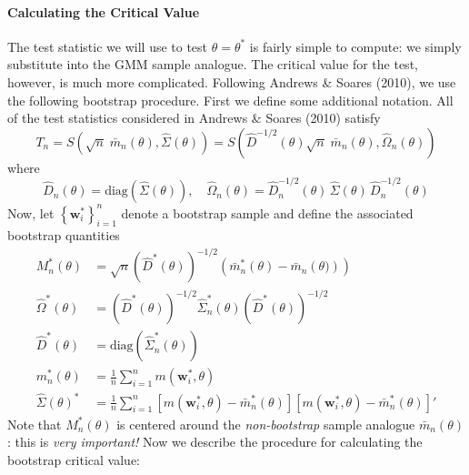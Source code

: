 \documentclass[12pt]{article}
\begin{document}
\paragraph{Calculating the Critical Value}
The test statistic we will use to test $\theta = \theta^*$ is fairly simple to compute: we simply substitute into the GMM sample analogue.
The critical value for the test, however, is much more complicated.
Following Andrews \& Soares (2010), we use the following bootstrap procedure.
First we define some additional notation.
All of the test statistics considered in Andrews \& Soares (2010) satisfy
\[
  T_n = S\left( \sqrt{n}\; \bar{m}_n(\theta), \widehat{\Sigma}(\theta) \right) = S\left( \widehat{D}^{-1/2}(\theta) \sqrt{n}\; \bar{m}_n(\theta), \widehat{\Omega}_n(\theta) \right)
\]
where
\[
  \widehat{D}_n(\theta) = \mbox{diag}\left( \widehat{\Sigma}\left( \theta \right) \right), \quad \widehat{\Omega}_n(\theta) = \widehat{D}_n^{-1/2}(\theta)\, \widehat{\Sigma}(\theta)\, \widehat{D}_n^{-1/2}(\theta)
\]
Now, let $\left\{ \mathbf{w}_i^* \right\}_{i=1}^n$ denote a bootstrap sample and define the associated bootstrap quantities
\begin{align*}
  M_n^*(\theta) &=  \sqrt{n} \left( \widehat{D}^*\left(\theta\right) \right)^{-1/2} \left( \bar{m}^*_n\left( \theta \right) - \bar{m}_n\left( \theta) \right) \right)\\
  \widehat{\Omega}^*(\theta) &= \left( \widehat{D}^*\left( \theta \right) \right)^{-1/2} \widehat{\Sigma}_n^*(\theta)\left( \widehat{D}^*\left( \theta \right) \right)^{-1/2} \\
  \widehat{D}^*\left( \theta \right) &= \mbox{diag}\left( \widehat{\Sigma}_n^*\left( \theta \right) \right)\\
  m_n^*(\theta) &= \frac{1}{n} \sum_{i=1}^n m(\mathbf{w}_i^*,\theta)\\
  \widehat{\Sigma}(\theta)^* &= \frac{1}{n} \sum_{i=1}^n \left[ m(\mathbf{w}_i^*, \theta) - \bar{m}_n^*(\theta) \right]\left[ m(\mathbf{w}_i^*, \theta) - \bar{m}_n^*(\theta) \right]'
\end{align*}
Note that $M_n^*(\theta)$ is centered around the \emph{non-bootstrap}  sample analogue $\bar{m}_n(\theta)$: this is \emph{very important!}
Now we describe the procedure for calculating the bootstrap critical value:
\end{document}
